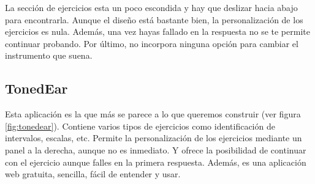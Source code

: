 \documentclass[12pt,twoside,titlepage]{report}
\begin{document}

La sección de ejercicios esta un poco escondida y hay que deslizar hacia abajo para encontrarla. Aunque el diseño está bastante bien, la personalización de los ejercicios es nula. Además, una vez hayas fallado en la respuesta no se te permite continuar probando. Por último, no incorpora ninguna opción para cambiar el instrumento que suena.
\cite{tonegym3}

\subsection{TonedEar}
\label{sec:TonedEar}

Esta aplicación es la que más se parece a lo que queremos construir (ver figura \ref{fig:tonedear}). Contiene varios tipos de ejercicios como identificación de intervalos, escalas, etc. Permite la personalización de los ejercicios mediante un panel a la derecha, aunque no es inmediato. Y ofrece la posibilidad de continuar con el ejercicio aunque falles en la primera respuesta. Además, es una aplicación web gratuita, sencilla, fácil de entender y usar.
\cite{tonedear1}
\end{document}
